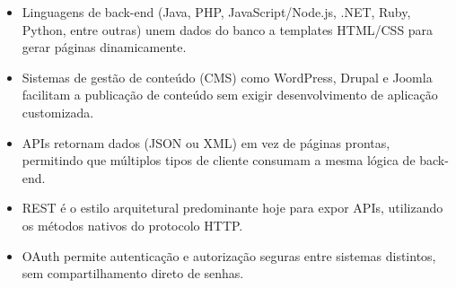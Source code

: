 \begin{itemize}
  \item Linguagens de back-end (Java, PHP, JavaScript/Node.js, .NET, Ruby, Python, entre outras) unem dados do banco a templates HTML/CSS para gerar páginas dinamicamente.
\end{itemize}

\begin{itemize}
  \item Sistemas de gestão de conteúdo (CMS) como WordPress, Drupal e Joomla facilitam a publicação de conteúdo sem exigir desenvolvimento de aplicação customizada.
\end{itemize}

\begin{itemize}
  \item APIs retornam dados (JSON ou XML) em vez de páginas prontas, permitindo que múltiplos tipos de cliente consumam a mesma lógica de back-end.
\end{itemize}

\begin{itemize}
  \item REST é o estilo arquitetural predominante hoje para expor APIs, utilizando os métodos nativos do protocolo HTTP.
\end{itemize}

\begin{itemize}
  \item OAuth permite autenticação e autorização seguras entre sistemas distintos, sem compartilhamento direto de senhas.
\end{itemize}
